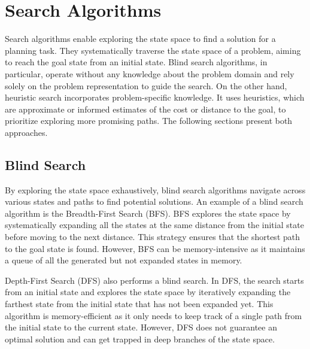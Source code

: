 \section{Search Algorithms}
\label{sec:background_searchalgorithms}

Search algorithms enable exploring the state space to find a solution for a planning task. They systematically traverse the state space of a problem, aiming to reach the goal state from an initial state. Blind search algorithms, in particular, operate without any knowledge about the problem domain and rely solely on the problem representation to guide the search. On the other hand, heuristic search incorporates problem-specific knowledge. It uses heuristics, which are approximate or informed estimates of the cost or distance to the goal, to prioritize exploring more promising paths. The following sections present both approaches.

\subsection{Blind Search}
\label{sec:background_blindsearch}

By exploring the state space exhaustively, blind search algorithms navigate across various states and paths to find potential solutions. An example of a blind search algorithm is the Breadth-First Search (BFS). BFS explores the state space by systematically expanding all the states at the same distance from the initial state before moving to the next distance. This strategy ensures that the shortest path to the goal state is found. However, BFS can be memory-intensive as it maintains a queue of all the generated but not expanded states in memory.

Depth-First Search (DFS) also performs a blind search. In DFS, the search
starts from an initial state and explores the state space by iteratively expanding the farthest state from the initial state that has not been expanded yet. This algorithm is memory-efficient as it only needs to keep track of a single path from the initial state to the current state. However, DFS does not guarantee an optimal solution and can get trapped in deep branches of the state space.

